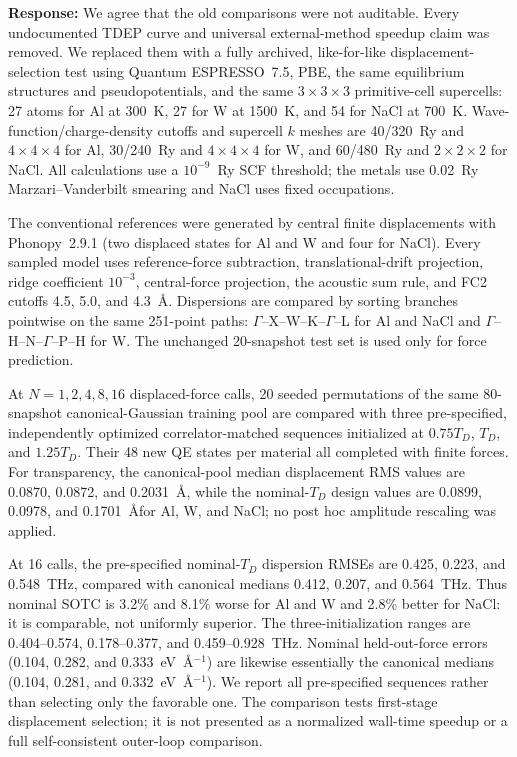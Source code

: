 \documentclass[11pt]{article}
\newcommand{\Answer}[1]{\par\noindent\color{black}\normalfont\textbf{Response:} #1\par\smallskip}
\begin{document}
\Answer{We agree that the old comparisons were not auditable. Every
undocumented TDEP curve and universal external-method speedup claim was removed.
We replaced them with a fully archived, like-for-like displacement-selection
test using Quantum ESPRESSO~7.5, PBE, the same equilibrium structures and
pseudopotentials, and the same $3\times3\times3$ primitive-cell supercells:
27 atoms for Al at 300~K, 27 for W at 1500~K, and 54 for NaCl at 700~K.
Wave-function/charge-density cutoffs and supercell $k$ meshes are
40/320~Ry and $4\times4\times4$ for Al, 30/240~Ry and
$4\times4\times4$ for W, and 60/480~Ry and $2\times2\times2$ for NaCl.
All calculations use a $10^{-9}$~Ry SCF threshold; the metals use 0.02~Ry
Marzari--Vanderbilt smearing and NaCl uses fixed occupations.

The conventional references were generated by central finite displacements
with Phonopy~2.9.1 (two displaced states for Al and W and four for NaCl).
Every sampled model uses reference-force subtraction, translational-drift
projection, ridge coefficient $10^{-3}$, central-force projection, the acoustic
sum rule, and FC2 cutoffs 4.5, 5.0, and 4.3~\AA. Dispersions are compared by
sorting branches pointwise on the same 251-point paths:
$\Gamma$--X--W--K--$\Gamma$--L for Al and NaCl and
$\Gamma$--H--N--$\Gamma$--P--H for W. The unchanged 20-snapshot test set is
used only for force prediction.

At $N=1,2,4,8,16$ displaced-force calls, 20 seeded permutations of the same
80-snapshot canonical-Gaussian training pool are compared with three
pre-specified, independently optimized correlator-matched sequences initialized
at $0.75T_D$, $T_D$, and $1.25T_D$. Their 48 new QE states per material all
completed with finite forces. For transparency, the canonical-pool median
displacement RMS values are 0.0870, 0.0872, and 0.2031~\AA, while the
nominal-$T_D$ design values are 0.0899, 0.0978, and 0.1701~\AA for Al, W, and
NaCl; no post hoc amplitude rescaling was applied.

At 16 calls, the pre-specified nominal-$T_D$ dispersion RMSEs are
0.425, 0.223, and 0.548~THz, compared with canonical medians
0.412, 0.207, and 0.564~THz. Thus nominal SOTC is 3.2\% and 8.1\% worse for
Al and W and 2.8\% better for NaCl: it is comparable, not uniformly superior.
The three-initialization ranges are 0.404--0.574, 0.178--0.377, and
0.459--0.928~THz. Nominal held-out-force errors
(0.104, 0.282, and 0.333~eV~\AA$^{-1}$) are likewise essentially the
canonical medians (0.104, 0.281, and 0.332~eV~\AA$^{-1}$). We report all
pre-specified sequences rather than selecting only the favorable one. The
comparison tests first-stage displacement selection; it is not presented as a
normalized wall-time speedup or a full self-consistent outer-loop comparison.}
\end{document}
